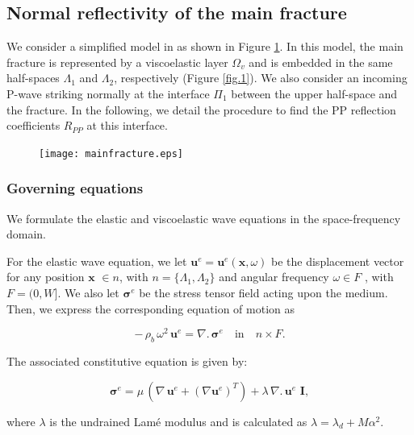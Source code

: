 \documentclass[draft]{agujournal2019}
\begin{document}
\subsection{Normal reflectivity of the main fracture}

We consider a simplified  model in as shown in Figure \ref{fig.3}. In this model, the main fracture is represented by a viscoelastic layer $\Omega_v$ and is embedded in the same  half-spaces $\Lambda_1$ and $\Lambda_2$, respectively (Figure \ref{fig.1}).
We also consider an incoming P-wave striking normally at the interface $\Pi_1$ between the upper half-space and the fracture. In the following, we detail the procedure to find the PP reflection coefficients $R_{PP}$ at this interface.

 \begin{figure}[!ht]
\centering
        \texttt{[image: mainfracture.eps]}
\caption{
}
\label{fig.3}
\end{figure}

\subsubsection{Governing equations}
We formulate the elastic and viscoelastic wave equations in the space-frequency domain. 

For the elastic wave equation, we let $\bm{u}^e=\bm{u}^e (\bm{x},\omega)$ be the displacement vector for any position $\bm{x}$ $\in n$, with  $n= \{\Lambda_1, \Lambda_2\} $ and angular frequency  $\omega \in F$ , with $F =(0,W]$. We also let $\bm{\sigma}^e$ be the stress tensor field acting upon the medium. Then, we express the corresponding equation of motion as
\begin{linenomath*}
\begin{equation}\label{Eq.14}
- \, \rho_b \,\omega^2 \, \bm{u}^e = \nabla . \, \bm{\sigma}^e \quad  \textrm{in} \quad n \times F.
\end{equation}
\end{linenomath*}
The associated constitutive equation is given by: 
\begin{linenomath*}
\begin{equation}\label{Eq.15}
\bm{\sigma}^e = \mu \,  \left( \nabla \, \bm{u}^e + ({\nabla  \bm{u}^e})^T  \right) + \lambda \,  \nabla . \, \bm{u}^e\,\, \bm{I},
\end{equation}
\end{linenomath*}
where $\lambda$ is the undrained Lamé modulus and is calculated as $\lambda = \lambda_d + M \alpha^2$.
\end{document}
